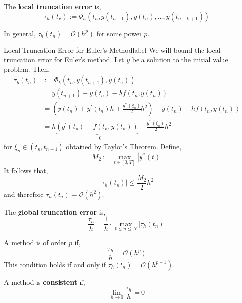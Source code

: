 \begin{defn}
	The \textbf{local truncation error} is,
	\[\tau_h\left(t_n\right):=\Phi_h\left(t_n, y\left(t_{n+1}\right), y\left(t_n\right), \ldots, y\left(t_{n-k+1}\right)\right)\]
\end{defn}

\begin{rmk}
In general, $\tau_h\left(t_n\right)=\mathcal{O}\left(h^p\right)$ for some power $p$.
\end{rmk}

\begin{ex}{Local Truncation Error for Euler's Method}{label}
	We will bound the local truncation error for Euler's method. Let $y$ be a solution to the initial value problem. Then,
	\begin{align*}
	\tau_h\left(t_n\right) &:=\Phi_h\left(t_n, y\left(t_{n+1}\right), y\left(t_n\right)\right) \\
	&=y\left(t_{n+1}\right)-y\left(t_n\right)-h f\left(t_n, y\left(t_n\right)\right) \\
	&=\left(y\left(t_n\right)+y^{\prime}\left(t_n\right) h+\frac{y^{\prime \prime}\left(\xi_n\right)}{2} h^2\right)-y\left(t_n\right)-h f\left(t_n, y\left(t_n\right)\right) \\
	&=h \underbrace{\left(y^{\prime}\left(t_n\right)-f\left(t_n, y\left(t_n\right)\right)\right.}_{= 0}+\frac{y^{\prime \prime}\left(\xi_n\right)}{2} h^2
	\end{align*}
	for $\xi_n \in (t_n, t_{n+1})$ obtained by  Taylor's Theorem. Define,
	\[M_2:=\max _{t \in[0, T]}\left|y^{\prime \prime}(t)\right|\]
	It follows that,
	\[\left|\tau_h\left(t_n\right)\right| \leq \frac{M_2}{2} h^2\]
	and therefore $\tau_h\left(t_n\right)=\mathcal{O}\left(h^2\right)$.
\end{ex}

\begin{defn}
	The \textbf{global truncation error} is,
	\[\frac{\tau_h}{h}=\frac{1}{h} \cdot \max _{0 \leq n \leq N} |\tau_h\left(t_n\right)|\]
\end{defn}

\begin{rmk}
	A method is of order $p$ if,
	\[\frac{\tau_h}{h}=\mathcal{O}\left(h^p\right)\]
	This condition holds if and only if $\tau_h\left(t_n\right)=\mathcal{O}\left(h^{p+1}\right)$.
\end{rmk}

\begin{defn}[Consistency]
	A method is \textbf{consistent} if,
	\[\lim _{h \rightarrow 0} \frac{\tau_h}{h}=0\]
\end{defn}

